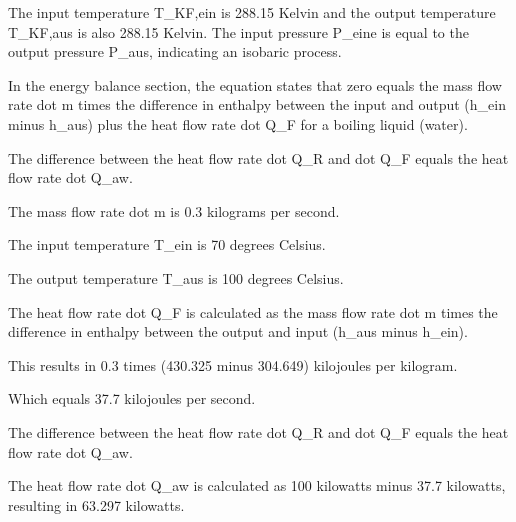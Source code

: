 The input temperature T_KF,ein is 288.15 Kelvin and the output temperature T_KF,aus is also 288.15 Kelvin. The input pressure P_eine is equal to the output pressure P_aus, indicating an isobaric process.

In the energy balance section, the equation states that zero equals the mass flow rate dot m times the difference in enthalpy between the input and output (h_ein minus h_aus) plus the heat flow rate dot Q_F for a boiling liquid (water).

The difference between the heat flow rate dot Q_R and dot Q_F equals the heat flow rate dot Q_aw.

The mass flow rate dot m is 0.3 kilograms per second.

The input temperature T_ein is 70 degrees Celsius.

The output temperature T_aus is 100 degrees Celsius.

The heat flow rate dot Q_F is calculated as the mass flow rate dot m times the difference in enthalpy between the output and input (h_aus minus h_ein).

This results in 0.3 times (430.325 minus 304.649) kilojoules per kilogram.

Which equals 37.7 kilojoules per second.

The difference between the heat flow rate dot Q_R and dot Q_F equals the heat flow rate dot Q_aw.

The heat flow rate dot Q_aw is calculated as 100 kilowatts minus 37.7 kilowatts, resulting in 63.297 kilowatts.